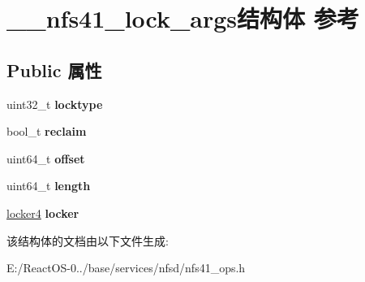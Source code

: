 \hypertarget{struct____nfs41__lock__args}{}\section{\+\_\+\+\_\+nfs41\+\_\+lock\+\_\+args结构体 参考}
\label{struct____nfs41__lock__args}
\subsection*{Public 属性}
\begin{DoxyCompactItemize}
\item 
\mbox{\label{struct____nfs41__lock__args_a2f48082dcc1484ce3cff681a0631cd8e}} 
uint32\+\_\+t {\bfseries locktype}
\item 
\mbox{\label{struct____nfs41__lock__args_a6f35d8428093252b35f4d8dd9d590a24}} 
bool\+\_\+t {\bfseries reclaim}
\item 
\mbox{\label{struct____nfs41__lock__args_a52f0b89a4fe13827df2e9ba04b115e36}} 
uint64\+\_\+t {\bfseries offset}
\item 
\mbox{\label{struct____nfs41__lock__args_a027ef2b43857f7d6ab06b22d65580b68}} 
uint64\+\_\+t {\bfseries length}
\item 
\mbox{\label{struct____nfs41__lock__args_a87b573613ec29e11d8d8d918e0cbcc41}} 
\hyperlink{struct____locker4}{locker4} {\bfseries locker}
\end{DoxyCompactItemize}


该结构体的文档由以下文件生成\+:\begin{DoxyCompactItemize}
\item 
E\+:/\+React\+O\+S-\/0../base/services/nfsd/nfs41\+\_\+ops.\+h\end{DoxyCompactItemize}
